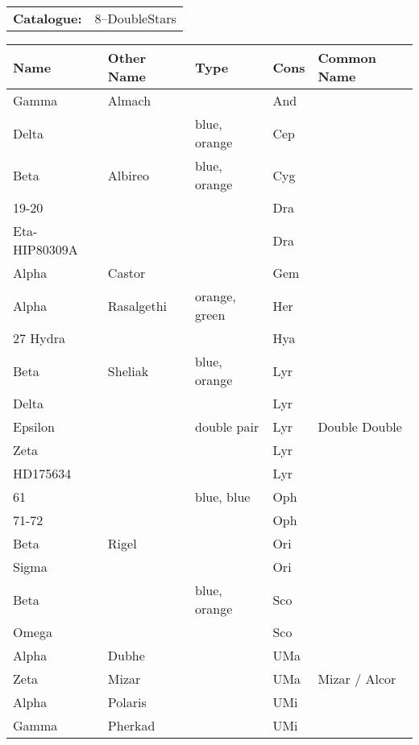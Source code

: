 \begin{tabular}{ p{0.9in} p{1.3in}}
{\bf Catalogue:} & 8--DoubleStars \\ 
\end{tabular}
\begin{longtable}{ p{0.7in}  p{1.0in}  p{0.6in}  p{0.9in}  p{5.1in} }
\hline 
{\bf Name} & {\bf Other Name} & {\bf Type} & {\bf Cons} & {\bf Common Name} \\ 
\hline 
Gamma & Almach &  & And &  \\ 
Delta &  & blue, orange & Cep &  \\ 
Beta & Albireo & blue, orange & Cyg &  \\ 
19-20 &  &  & Dra &  \\ 
Eta-HIP80309A &  &  & Dra &  \\ 
Alpha & Castor &  & Gem &  \\ 
Alpha & Rasalgethi & orange, green & Her &  \\ 
27 Hydra &  &  & Hya &  \\ 
Beta & Sheliak & blue, orange & Lyr &  \\ 
Delta &  &  & Lyr &  \\ 
Epsilon &  & double pair & Lyr & Double Double \\ 
Zeta &  &  & Lyr &  \\ 
HD175634 &  &  & Lyr &  \\ 
61 &  & blue, blue & Oph &  \\ 
71-72 &  &  & Oph &  \\ 
Beta & Rigel &  & Ori &  \\ 
Sigma &  &  & Ori &  \\ 
Beta &  & blue, orange & Sco &  \\ 
Omega &  &  & Sco &  \\ 
Alpha & Dubhe &  & UMa &  \\ 
Zeta & Mizar &  & UMa & Mizar / Alcor \\ 
Alpha & Polaris &  & UMi &  \\ 
Gamma & Pherkad &  & UMi &  \\ 
\hline 
\end{longtable} 
